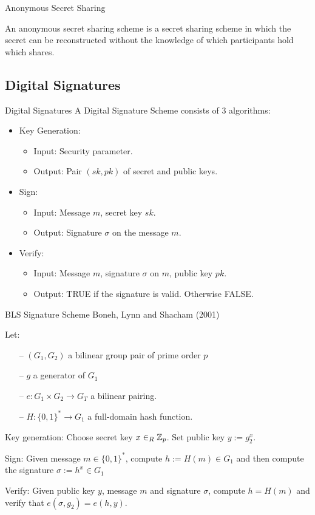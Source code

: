 \begin{frame}{Anonymous Secret Sharing}
\begin{defn}
An anonymous secret sharing scheme is a secret sharing scheme in which the secret can be reconstructed without the knowledge of which participants hold which shares.
\end{defn}

\end{frame}


\subsection{Digital Signatures}
\begin{frame}{Digital Signatures}
A Digital Signature Scheme consists of 3 algorithms:
\begin{itemize}
\item Key Generation:
	\begin{itemize}
	    \item Input: Security parameter.
	    \item Output: Pair $(sk,pk)$ of secret and public keys.
	\end{itemize}
\item Sign:
	\begin{itemize}
	    \item Input: Message $m$, secret key $sk$.
	    \item Output: Signature $\sigma$ on the message $m$.
	\end{itemize}
\item Verify:
	\begin{itemize}
	    \item Input: Message $m$, signature $\sigma$ on $m$, public key $pk$.
	    \item Output: TRUE if the signature is valid. Otherwise FALSE.
	\end{itemize}
\end{itemize}
\end{frame}

\begin{frame}{BLS Signature Scheme}
Boneh, Lynn and Shacham (2001)

Let:
\begin{itemize}
\item[--] $(G_1,G_2)$ a bilinear group pair of prime order $p$
\item[--] $g$ a generator of $G_1$
\item[--] $e: G_1 \times G_2 \rightarrow G_T$ a bilinear pairing.
\item[--] $H: \{0,1\}^\ast \rightarrow G_1$ a full-domain hash function.
\end{itemize}
Key generation: Choose secret key $x \in_R {\mathbb Z}_p$. Set public key $y:=g_2^x$.

Sign: Given message $m \in \{0,1\}^\ast$, compute $h:= H(m) \in G_1$ and then compute the signature $\sigma:= h^x \in G_1$

Verify: Given public key $y$, message $m$ and signature $\sigma$, compute $h = H(m)$ and verify that $e(\sigma,g_2) = e(h,y)$.
\end{frame}

